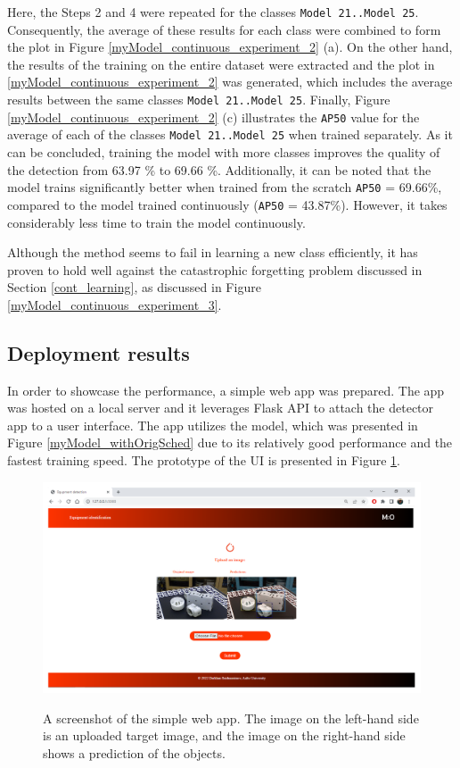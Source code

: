 Here,  the Steps 2 and 4 were repeated for the classes \texttt{Model 21..Model 25}. Consequently, the average of these results for each class were combined to form the plot in Figure \ref{myModel_continuous_experiment_2} (a). On the other hand, the results of the training on the entire dataset were extracted and the plot in  \ref{myModel_continuous_experiment_2} was generated, which includes the average results between the same classes \texttt{Model 21..Model 25}. Finally, Figure \ref{myModel_continuous_experiment_2} (c) illustrates the \texttt{AP50} value for the average of each of the classes \texttt{Model 21..Model 25} when trained separately. As it can be concluded, training the model with more classes improves the quality of the detection from 63.97 \% to 69.66 \%. Additionally, it can be noted that the model trains significantly better when trained from the scratch \texttt{AP50} = 69.66\%, compared to the model trained continuously (\texttt{AP50} = 43.87\%). However, it takes considerably less time to train the model continuously.

Although the method seems to fail in learning a new class efficiently, it has proven to hold well against the catastrophic forgetting problem discussed in Section \ref{cont_learning}, as discussed in Figure \ref{myModel_continuous_experiment_3}. 

\subsection{Deployment results}
In order to showcase the performance, a simple web app was prepared. The app was hosted on a local server and it leverages Flask API to attach the detector app to a user interface. The app utilizes the model, which was presented in Figure \ref{myModel_withOrigSched} due to its relatively good performance and the fastest training speed. The prototype of the UI is presented in Figure \ref{demo}. 

\begin{figure}[htb]
	\begin{center}
		\includegraphics[width=14cm]{./demo.png}
	\end{center}
	\caption{A screenshot of the simple web app. The image on the left-hand side is an uploaded target image, and the image on the right-hand side shows a prediction of the objects.}
	\begin{center}
		\label{demo}
	\end{center}
\end{figure}

